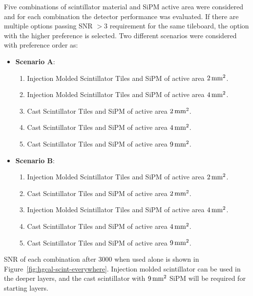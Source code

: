 Five combinations of scintillator material and \gls{SiPM} active area
were considered and for each combination the detector
performance was evaluated. If there are
multiple options passing \gls{SNR} \(> 3\) requirement for the same tileboard,
the option with the higher preference is selected. Two different scenarios were
considered with preference order as:

\begin{itemize}
  \item \textbf{Scenario A}:
        \begin{enumerate}
          \item Injection Molded Scintillator Tiles and SiPM of active area \( 2\,\text{mm}{}^2 \).
          \item Injection Molded Scintillator Tiles and SiPM of active area \( 4\,\text{mm}{}^2 \).
          \item Cast Scintillator Tiles and SiPM of active area \( 2\,\text{mm}{}^2 \).
          \item Cast Scintillator Tiles and SiPM of active area \( 4\,\text{mm}{}^2 \).
          \item Cast Scintillator Tiles and SiPM of active area \( 9\,\text{mm}{}^2 \).
        \end{enumerate}
  \item \textbf{Scenario B}:
        \begin{enumerate}
          \item Injection Molded Scintillator Tiles and SiPM of active area \( 2\,\text{mm}{}^2 \).
          \item Cast Scintillator Tiles and SiPM of active area \( 2\,\text{mm}{}^2 \).
          \item Injection Molded Scintillator Tiles and SiPM of active area \( 4\,\text{mm}{}^2 \).
          \item Cast Scintillator Tiles and SiPM of active area \( 4\,\text{mm}{}^2 \).
          \item Cast Scintillator Tiles and SiPM of active area \( 9\,\text{mm}{}^2 \).
        \end{enumerate}
\end{itemize}

\gls{SNR} of each combination after 3000 \fbinv{} when used alone is shown in
Figure~\ref{fig:hgcal-scint-everywhere}.
Injection molded scintillator can be used in the deeper layers,
and the cast scintillator with \(9 \,\text{mm}{}^{2}\) \gls{SiPM} will be required
for starting layers.

